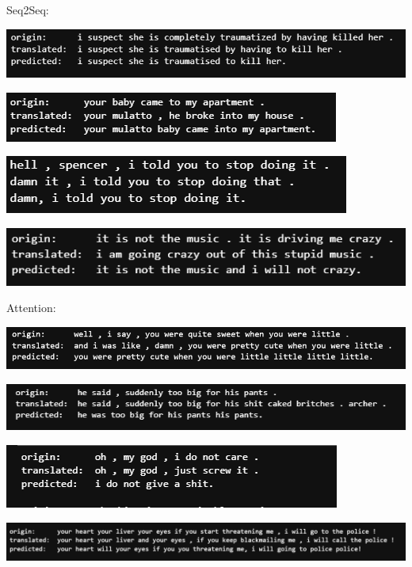 \documentclass{article}
\begin{document}
Seq2Seq:

\includegraphics[scale=0.42]{figures/Seq2Seq_result_1.png}

\includegraphics[scale=0.42]{figures/Seq2Seq_result_2.png}

\includegraphics[scale=0.42]{figures/Seq2Seq_result_3.png}

\includegraphics[scale=0.5]{figures/Seq2Seq_result_4.png}

Attention:

\includegraphics[scale=0.42]{figures/Attention_result_1.png}

\includegraphics[scale=0.42]{figures/Attention_result_2.png}

\includegraphics[scale=0.5]{figures/Attention_result_3.png}

\includegraphics[scale=0.4]{figures/Attention_result_4.png}
\end{document}
